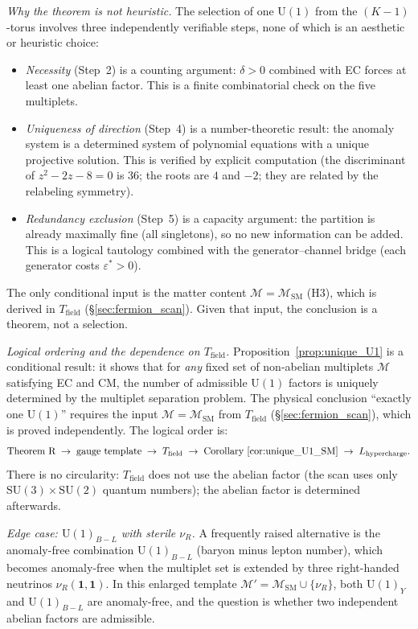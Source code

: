 \documentclass[11pt,a4paper]{article}
\theoremstyle{definition}
\newcommand{\SU}{\mathrm{SU}}
\newcommand{\U}{\mathrm{U}}
\begin{document}
\noindent\textit{Why the theorem is not heuristic.}\quad
The selection of one $\U(1)$ from the $(K-1)$-torus involves three
independently verifiable steps, none of which is an aesthetic or
heuristic choice:
\begin{itemize}[nosep]
  \item \textit{Necessity} (Step~2) is a counting argument:
  $\delta > 0$ combined with EC forces at least one abelian factor.
  This is a finite combinatorial check on the five multiplets.
  \item \textit{Uniqueness of direction} (Step~4) is a
  number-theoretic result: the anomaly system is a determined system
  of polynomial equations with a unique projective solution.  This is
  verified by explicit computation (the discriminant of
  $z^2 - 2z - 8 = 0$ is $36$; the roots are $4$ and $-2$; they are
  related by the relabeling symmetry).
  \item \textit{Redundancy exclusion} (Step~5) is a capacity
  argument: the partition is already maximally fine (all singletons),
  so no new information can be added.  This is a logical tautology
  combined with the generator--channel bridge (each generator costs
  $\varepsilon^* > 0$).
\end{itemize}
The only conditional input is the matter content
$\mathcal{M} = \mathcal{M}_{\mathrm{SM}}$ (H3), which is derived in
$T_{\mathrm{field}}$ (\S\ref{sec:fermion_scan}).  Given that input,
the conclusion is a theorem, not a selection.

\smallskip\noindent\textit{Logical ordering and the dependence on
$T_{\mathrm{field}}$.}\quad
Proposition~\ref{prop:unique_U1} is a conditional
result: it shows that for \emph{any} fixed set of non-abelian multiplets
$\mathcal{M}$ satisfying EC and CM, the number of admissible $\U(1)$
factors is uniquely determined by the multiplet separation problem.
The physical conclusion ``exactly one $\U(1)$'' requires the input
$\mathcal{M} = \mathcal{M}_{\mathrm{SM}}$ from $T_{\mathrm{field}}$
(\S\ref{sec:fermion_scan}), which is proved independently.  The logical
order is:
\[
  \text{Theorem R} \;\to\; \text{gauge template}
  \;\to\; T_{\mathrm{field}} \;\to\;
  \text{Corollary~\ref{cor:unique_U1_SM}}
  \;\to\; L_{\mathrm{hypercharge}}.
\]
There is no circularity: $T_{\mathrm{field}}$ does not use the abelian
factor (the scan uses only $\SU(3) \times \SU(2)$ quantum numbers);
the abelian factor is determined afterwards.

\smallskip\noindent\textit{Edge case: $\U(1)_{B-L}$ with sterile
$\nu_R$.}\quad
A frequently raised alternative is the anomaly-free combination
$\U(1)_{B-L}$ (baryon minus lepton number), which becomes anomaly-free
when the multiplet set is extended by three right-handed neutrinos
$\nu_R(\mathbf{1},\mathbf{1})$.  In this enlarged template
$\mathcal{M}' = \mathcal{M}_{\mathrm{SM}} \cup \{\nu_R\}$, both
$\U(1)_Y$ and $\U(1)_{B-L}$ are anomaly-free, and the question is
whether two independent abelian factors are admissible.
\end{document}
